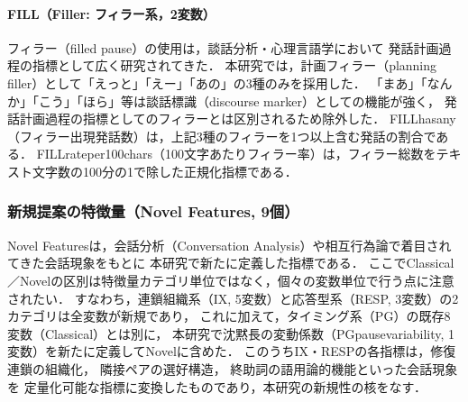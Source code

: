 \documentclass[dvipdfmx,11pt,a4paper]{bxjsarticle}
\renewcommand{\_}{\paperorigunderscore\allowbreak}%
\begin{document}
\paragraph{FILL（Filler: フィラー系，2変数）}
フィラー（filled pause）の使用は，談話分析・心理言語学において
発話計画過程の指標として広く研究されてきた\cite{clark1996,watanabe2003}．
本研究では，計画フィラー（planning filler）として「えっと」「えー」「あの」の3種のみを採用した．
「まあ」「なんか」「こう」「ほら」等は談話標識（discourse marker）としての機能が強く，
発話計画過程の指標としてのフィラーとは区別されるため除外した\cite{watanabe2003}．
FILL\_has\_any（フィラー出現発話数）は，上記3種のフィラーを1つ以上含む発話の割合である．
FILL\_rate\_per\_100chars（100文字あたりフィラー率）は，フィラー総数をテキスト文字数の100分の1で除した正規化指標である．

\subsubsection{新規提案の特徴量（Novel Features, 9個）}
\label{sec:features_novel}

Novel Featuresは，会話分析（Conversation Analysis）や相互行為論で着目されてきた会話現象をもとに
本研究で新たに定義した指標である．
ここでClassical／Novelの区別は特徴量カテゴリ単位ではなく，個々の変数単位で行う点に注意されたい．
すなわち，連鎖組織系（IX, 5変数）と応答型系（RESP, 3変数）の2カテゴリは全変数が新規であり，
これに加えて，タイミング系（PG）の既存8変数（Classical）とは別に，
本研究で沈黙長の変動係数（PG\_pause\_variability, 1変数）を新たに定義してNovelに含めた．
このうちIX・RESPの各指標は，修復連鎖の組織化\cite{schegloff1977}，
隣接ペアの選好構造\cite{sacks1974}，
終助詞の語用論的機能といった会話現象を
定量化可能な指標に変換したものであり，本研究の新規性の核をなす．
\end{document}
